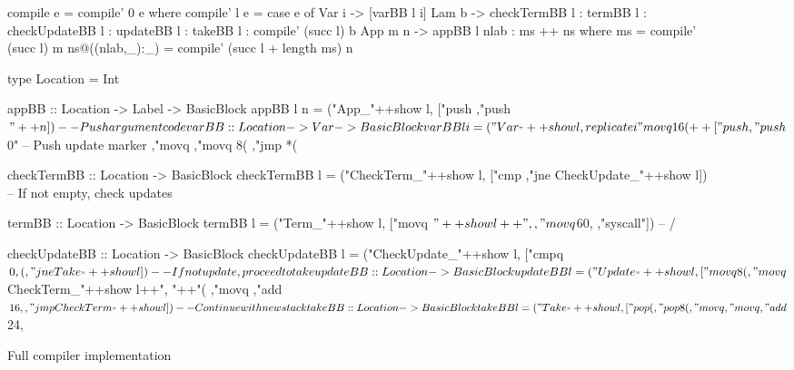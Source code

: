 \begin{figure*}
\begin{code}
compile e = compile' 0 e where 
  compile' l e = case e of
    Var i -> [varBB l i]
    Lam b -> checkTermBB l 
           : termBB l 
           : checkUpdateBB l 
           : updateBB l 
           : takeBB l 
           : compile' (succ l) b
    App m n -> appBB l nlab : ms ++ ns where
      ms = compile' (succ l) m
      ns@((nlab,_):_) = compile' (succ l + length ms) n

type Location = Int

appBB :: Location -> Label -> BasicBlock
appBB l n = ("App_"++show l, 
  ["push %
  ,"push $"++n])                                    -- Push argument code

varBB :: Location -> Var -> BasicBlock
varBB l i = ("Var_"++show l,
  replicate i "movq 16(%
  ++ ["push %
     ,"push $0"                                     -- Push update marker
     ,"movq %
     ,"movq 8(%
     ,"jmp *(%

checkTermBB :: Location -> BasicBlock
checkTermBB l = ("CheckTerm_"++show l,
  ["cmp %
  ,"jne CheckUpdate_"++show l])                     -- If not empty, check updates

termBB :: Location -> BasicBlock
termBB l = ("Term_"++show l,
  ["movq $"++show l++", %
  ,"movq $60, %
  ,"syscall"])                                      -- / 

checkUpdateBB :: Location -> BasicBlock
checkUpdateBB l = ("CheckUpdate_"++show l,
  ["cmpq $0, (%
  ,"jne Take_"++show l])                            -- If not update, proceed to take

updateBB :: Location -> BasicBlock
updateBB l = ("Update_"++show l,
  ["movq 8(%
  ,"movq $CheckTerm_"++show l++", "++"(%
  ,"movq %
  ,"add $16, %
  ,"jmp CheckTerm_"++show l])                       --  Continue with new stack
 
takeBB :: Location -> BasicBlock
takeBB l = ("Take_"++show l,
  ["pop (%
  ,"pop 8(%
  ,"movq %
  ,"movq %
  ,"add $24, %

\end{code}
\caption{Full compiler implementation}
\label{fig:impl}
\end{figure*}
